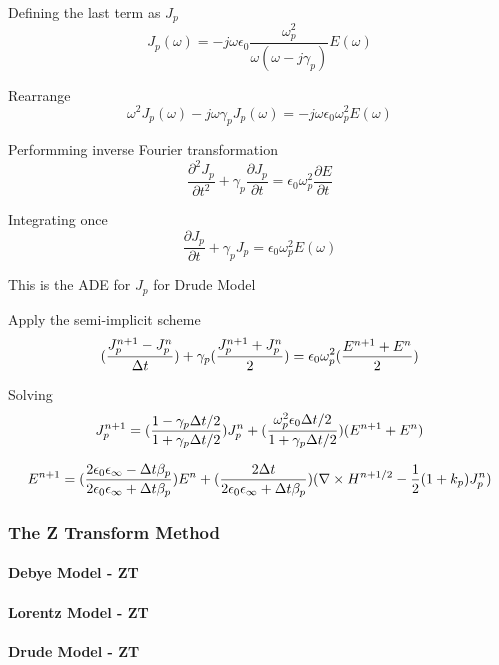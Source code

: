 Defining the last term as $J_p$
\begin{displaymath}
  J_p(\omega) = -j\omega\epsilon_0\frac{\omega_p^2}{\omega(\omega-j\gamma_p)}E(\omega)
\end{displaymath}

Rearrange
\begin{displaymath}
  \omega^2J_p(\omega) - j\omega\gamma_pJ_p(\omega) = -j\omega\epsilon_0\omega_p^2 E(\omega)
\end{displaymath}

Performming inverse Fourier transformation
\begin{displaymath}
  \frac{\partial^2 J_p}{\partial t^2} + \gamma_p \frac{\partial J_p}{\partial t} = \epsilon_0\omega_p^2\frac{\partial E}{\partial t}
\end{displaymath}

Integrating once
\begin{displaymath}
  \frac{\partial J_p}{\partial t} + \gamma_p J_p = \epsilon_0 \omega_p^2 E(\omega)
\end{displaymath}

This is the ADE for $J_p$ for Drude Model

Apply the semi-implicit scheme
\begin{displaymath}
  \Huge(\frac{J_p^{n+1} - J_p^n}{\Delta t}\Huge) + \gamma_{p}\Huge(\frac{J_p^{n+1} + J_p^n}{2}\Huge) = \epsilon_0\omega_p^2\Huge(\frac{E^{n+1} + E^n}{2}\Huge)
\end{displaymath}

Solving
\begin{displaymath}
  J_p^{n+1} = \Huge(\frac{1-\gamma_p\Delta t /2}{1+\gamma_p\Delta t /2}\Huge)J_p^n + \Huge(\frac{\omega_p^2\epsilon_0\Delta t /2}{1+\gamma_p\Delta t /2}\Huge)(E^{n+1}+E^n)
\end{displaymath}


\begin{displaymath}
  E^{n+1} = \Huge(\frac{2\epsilon_0\epsilon_{\infty} - \Delta t \beta_p}{2\epsilon_0\epsilon_{\infty} + \Delta t \beta_p}\Huge)E^n + \Huge(\frac{2\Delta t}{2\epsilon_0\epsilon_{\infty} + \Delta t \beta_p}\Huge)\Huge(\nabla\times H^{n+1/2} - \frac{1}{2}(1+k_p)J_p^n\Huge)
\end{displaymath}



\subsubsection{The Z Transform Method}
\paragraph{Debye Model - ZT}

\paragraph{Lorentz Model - ZT}

\paragraph{Drude Model - ZT}
